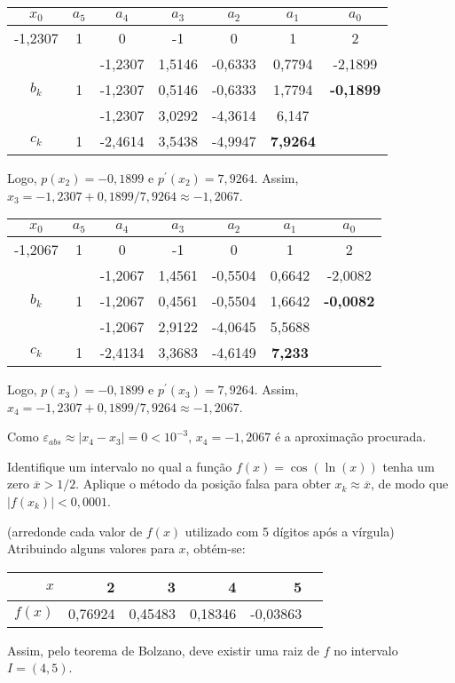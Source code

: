 \documentclass[12pt,a4paper]{article}
\begin{document}
\begin{ExerciseList}
\begin{center}
\begin{tabular}{|c|c|c|c|c|c|c|}
\hline
$x_0$ & $a_5$ & $a_4$ & $a_3$ & $a_2$ & $a_1$ & $a_0$ \\
\hline
-1,2307 & 1 & 0 & -1 & 0 & 1 & 2 \\
\hline
 &   & -1,2307 & 1,5146 & -0,6333 & 0,7794 & -2,1899 \\
\hline
$b_k$ & 1 & -1,2307 & 0,5146 & -0,6333 & 1,7794 & \textbf{-0,1899} \\
\hline
 &   & -1,2307 & 3,0292 & -4,3614 & 6,147 & \\
\hline
$c_k$ & 1 & -2,4614 & 3,5438 & -4,9947 & \textbf{7,9264} & \\
\hline
\end{tabular}
\end{center}
Logo, $p(x_2) = -0,1899$ e $p^\prime(x_2) = 7,9264$. Assim,
$x_3 = -1,2307 + 0,1899/7,9264 \approx -1,2067$.

\begin{center}
\begin{tabular}{|c|c|c|c|c|c|c|}
\hline
$x_0$ & $a_5$ & $a_4$ & $a_3$ & $a_2$ & $a_1$ & $a_0$ \\
\hline
-1,2067 & 1 & 0 & -1 & 0 & 1 & 2\\
\hline
&  & -1,2067 & 1,4561 & -0,5504 & 0,6642 & -2,0082\\
\hline
$b_k$ & 1 & -1,2067 & 0,4561 & -0,5504 & 1,6642 & \textbf{-0,0082} \\
\hline
&  & -1,2067 & 2,9122 & -4,0645 & 5,5688 & \\
\hline
$c_k$ & 1 & -2,4134 & 3,3683 & -4,6149 & \textbf{7,233} & \\
\hline
\end{tabular}
\end{center}
Logo, $p(x_3) = -0,1899$ e $p^\prime(x_3) = 7,9264$. Assim,
$x_4 = -1,2307 + 0,1899/7,9264 \approx -1,2067$.

Como $\varepsilon_{abs} \approx |x_4 - x_3| = 0 < 10^{-3}$, $x_4 = -1,2067$ é a aproximação procurada.

\Exercise[title={2,5}] Identifique um intervalo no qual a função $f(x) = \cos(\ln(x))$ tenha um zero $\overline{x} > 1/2$. Aplique o método da posição falsa para obter $x_k \approx \overline{x}$, de modo que $|f(x_k)| < 0,0001$.

(arredonde cada valor de $f(x)$ utilizado com 5 dígitos após a vírgula)
\Answer Atribuindo alguns valores para $x$, obtém-se:
\begin{center}
\begin{tabular}{|r|r|r|r|r|r|}
\hline
$x$    & 2   & 3   & 4    &  5 \\
\hline
$f(x)$ & 0,76924 & 0,45483 & 0,18346 & -0,03863 \\
\hline
\end{tabular}
\end{center}
Assim, pelo teorema de Bolzano, deve existir uma raiz de $f$ no intervalo $I = (4, 5)$.


\end{ExerciseList}
\end{document}
